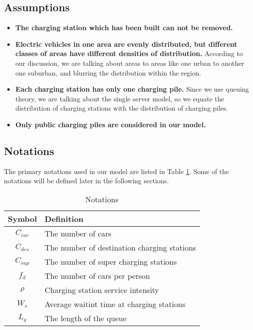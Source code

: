 \documentclass[12pt]{article}  %
\begin{document}
\subsection{Assumptions}
\begin{itemize}
    \item \textbf{The charging station which has been built can not be removed.} 
    \item \textbf{Electric vehicles in one area are evenly distributed, but 
    	different classes of areas have different densities of distribution.}
    	According to our discussion, we are talking about areas to areas like one urban to another one suburban, and blurring the distribution within the region.
	\item \textbf{Each charging station has only one charging pile.}
	Since we use queuing theory, we are talking about the single server model, so we equate the distribution of charging stations with the distribution of charging piles. 
	\item \textbf{Only public charging piles are considered in our model.}
\end{itemize}

\subsection{Notations}
The primary notations used in our model are listed in Table \ref{tb:notation}. 
Some of the notations will be defined later in the following sections.
\begin{table}[!htbp]
\begin{center}
\caption{Notations}
\begin{tabular}{cl}
	\toprule
	\multicolumn{1}{m{3cm}}{\centering Symbol}
	&\multicolumn{1}{m{8cm}}{\centering Definition}\\
	\midrule
	${C_{car}}$&The number of cars\\
	${C_{des}}$&The number of destination charging stations\\
	${C_{sup}}$&The number of super charging stations\\
	${f_d}$&The number of cars per person\\
	$\rho $&Charging station service intensity\\
	${W_s}$&Average waitint time at charging stations\\
	${L_q}$&The length of the queue\\
	\bottomrule
\end{tabular}\label{tb:notation}
\end{center}
\end{table}
\end{document}
